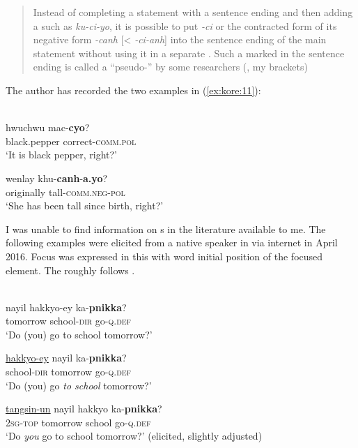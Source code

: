 \begin{quote}
Instead of completing a statement with a sentence ending and then adding a  such as \textit{ku-ci-yo}, it is possible to put \textit{-ci} or the contracted form of its negative form \textit{-canh} [< \textit{-ci-anh}] into the sentence ending of the main statement without using it in a separate . Such a  marked in the sentence ending is called a “pseudo-” by some researchers (\citealt[2788]{Yoon2010}, my brackets)
\end{quote}

\noindent The author has recorded the two examples in (\ref{ex:kore:11}):

\ea%
    \label{ex:kore:11}
    \\
    \ea
    \gll hwuchwu  mac-\textbf{{cyo}}?\\
    black.pepper  correct-\textsc{comm.pol}\\
    \glt ‘It is black pepper, right?’
    
    \ex
    \gll wenlay    khu-\textbf{{canh}}-\textbf{{a.yo}}?\\
    originally  tall-\textsc{comm.neg}-\textsc{pol}\\
    \glt ‘She has been tall since birth, right?’ \citep[2788]{Yoon2010}
    \z
    \z

I was unable to find information on s in the literature available to me. The following examples were elicited from a native speaker in  via internet in April 2016. Focus was expressed in this  with word initial position of the focused element. The  roughly follows \citet{Song2005}.

\ea%
    \label{ex:kore:12}
    \\
    \ea
    \gll nayil hakkyo-ey  ka-\textbf{{p}}\textbf{{nikka}}?\\
    tomorrow  school-\textsc{dir}  go-\textsc{q.def}\\
    \glt ‘Do (you) go to school tomorrow?’
    
    \ex
    \gll \uline{hakkyo-ey}   nayil    ka-\textbf{{pnikka}}?\\
    school-\textsc{dir}  tomorrow  go-\textsc{q.def}\\
    \glt ‘Do (you) go \textit{to school} tomorrow?’
    
    \ex
    \gll \uline{tangsin-un}  nayil    hakkyo    ka-\textbf{{pnikka}}?\\
    2\textsc{sg}-\textsc{top}  tomorrow  school    go-\textsc{q.def}\\
    \glt ‘Do \textit{you} go to school tomorrow?’ (elicited, slightly adjusted)
    \z
    \z 

